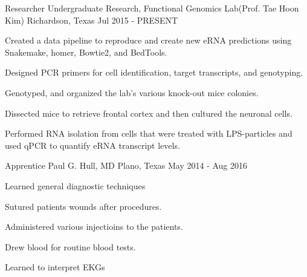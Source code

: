 \begin{cventries}
	\cventry
	{Researcher} %
	{Undergraduate Research, Functional Genomics Lab(Prof. Tae Hoon Kim)} %
	{Richardson, Texas} %
	{Jul 2015 - PRESENT} %
	{
		\begin{cvitems} %
			\item {Created a data pipeline to reproduce and create new eRNA predictions using Snakemake, homer, Bowtie2, and BedTools.}
			\item {Designed PCR primers for cell identification, target transcripts, and genotyping.}
			\item {Genotyped, and organized the lab's various knock-out mice colonies.}
			\item {Dissected mice to retrieve frontal cortex and then cultured the neuronal cells.}
			\item {Performed RNA isolation from cells that were treated with LPS-particles and used qPCR to quantify eRNA transcript levels.}
		\end{cvitems}
	}

	\cventry
	{Apprentice} %
	{Paul G. Hull, MD} %
	{Plano, Texas} %
	{May 2014 - Aug 2016} %
	{
		\begin{cvitems} %
			\item {Learned general diagnostic techniques}
			\item {Sutured patients wounds after procedures.}
			\item {Administered various injectioins to the patients.}
			\item {Drew blood for routine blood tests.}
			\item {Learned to interpret EKGs}
		\end{cvitems}
	}

\end{cventries}
